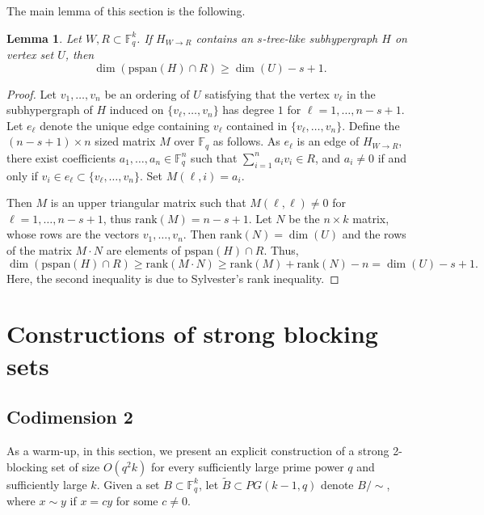 \documentclass[11pt]{article}
\theoremstyle{plain}
\newtheorem{lemma}[theorem]{Lemma}
\theoremstyle{definition}
\begin{document}
 The main lemma of this section is the following.

\begin{lemma}\label{lemma:tree-like}
Let $W,R\subset \mathbb{F}_q^k$. If $H_{W\rightarrow R}$ contains an $s$-tree-like subhypergraph $H$ on vertex set $U$, then 
$$\dim(\mathrm{pspan}(H)\cap R)\geq \dim(U)-s+1.$$
\end{lemma}

\begin{proof}
 Let $v_1,\dots,v_n$ be an ordering of $U$ satisfying that the vertex $v_{\ell}$ in the subhypergraph of $H$ induced on $\{v_{\ell},\dots,v_n\}$ has degree $1$ for $\ell=1,\dots,n-s+1$. Let $e_{\ell}$ denote the unique edge containing $v_{\ell}$ contained in $\{v_{\ell},\dots,v_n\}$. Define the $(n-s+1)\times n$ sized matrix $M$ over $\mathbb{F}_q$ as follows. As $e_{\ell}$ is an edge of $H_{W\rightarrow R}$, there exist coefficients $a_1,\dots,a_n\in\mathbb{F}_q^n$ such that $\sum_{i=1}^n a_i v_i\in R$, and $a_i\neq 0$ if and only if $v_i\in e_{\ell}\subset \{v_{\ell},\dots,v_n\}$. Set $M(\ell,i)=a_i$. 

 Then $M$ is an upper triangular matrix such that $M(\ell,\ell)\neq 0$ for $\ell=1,\dots,n-s+1$, thus $\mbox{rank}(M)=n-s+1$. Let $N$ be the $n\times k$ matrix, whose rows are the vectors $v_1,\dots,v_n$. Then $\mbox{rank}(N)=\dim(U)$ and the rows of the matrix $M\cdot N$ are elements of $\mbox{pspan}(H)\cap R$. Thus, 
 $$\dim(\mbox{pspan}(H)\cap R)\geq \mbox{rank}(M\cdot N)\geq \mbox{rank}(M)+\mbox{rank}(N)-n= \dim(U)-s+1.$$
 Here, the second inequality is due to Sylvester's rank inequality.
\end{proof}


\section{Constructions of strong blocking sets}
\subsection{Codimension 2}\label{sect:s=2}

As a warm-up, in this section, we present an explicit construction of a strong 2-blocking set of size $O(q^2 k)$ for every sufficiently large prime power $q$ and sufficiently large $k$. Given a set $B\subset \mathbb{F}_q^k$, let $\tilde{B}\subset PG(k-1,q)$ denote $B/\sim$, where $x\sim y$ if $x=cy$ for some $c\neq 0$.

\medskip
\end{document}
